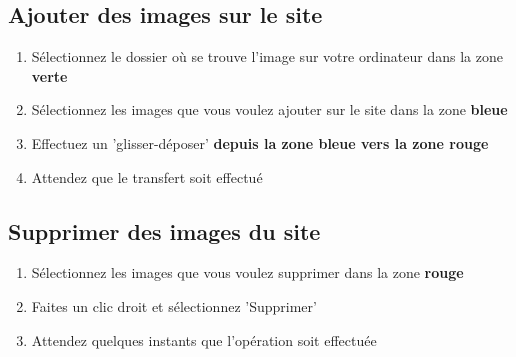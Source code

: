\documentclass[10pt,a4paper]{article}
\begin{document}
\subsection{Ajouter des images sur le site}
\begin{enumerate}
\item Sélectionnez le dossier où se trouve l'image sur votre ordinateur dans la zone \textbf{verte}
\item Sélectionnez les images que vous voulez ajouter sur le site dans la zone \textbf{bleue}
\item Effectuez un 'glisser-déposer' \textbf{depuis la zone bleue vers la zone rouge}
\item Attendez que le transfert soit effectué
\end{enumerate}

\subsection{Supprimer des images du site}
\begin{enumerate}
\item Sélectionnez les images que vous voulez supprimer dans la zone \textbf{rouge}
\item Faites un clic droit et sélectionnez 'Supprimer'
\item Attendez quelques instants que l'opération soit effectuée
\end{enumerate}
\end{document}
